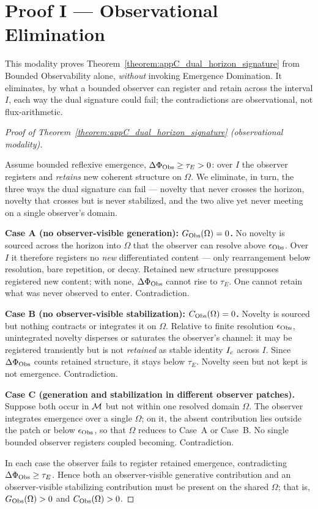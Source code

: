 \section{Proof I --- Observational Elimination} \label{sec:appC_proof_observational}
This modality proves Theorem~\ref{theorem:appC_dual_horizon_signature} from Bounded
Observability alone, \emph{without} invoking Emergence Domination. It eliminates, by
what a bounded observer can register and retain across the interval \(I\), each way
the dual signature could fail; the contradictions are observational, not
flux-arithmetic.
\begin{proof}[Proof of Theorem~\ref{theorem:appC_dual_horizon_signature} (observational modality)]
\label{proof:appC_dual_horizon_signature_observational}
\leavevmode

Assume bounded reflexive emergence, \(\Delta\Phi_{\mathrm{Obs}}\ge\tau_E>0\): over \(I\) the
observer registers and \emph{retains} new coherent structure on \(\Omega\). We
eliminate, in turn, the three ways the dual signature can fail --- novelty that never
crosses the horizon, novelty that crosses but is never stabilized, and the two alive
yet never meeting on a single observer's domain.

\textbf{Case A (no observer-visible generation): \(G_{\mathrm{Obs}}(\Omega)=0\).} No novelty
is sourced across the horizon into \(\Omega\) that the observer can resolve above
\(\epsilon_{\mathrm{Obs}}\). Over \(I\) it therefore registers no \emph{new} differentiated
content --- only rearrangement below resolution, bare repetition, or decay. Retained
new structure presupposes registered new content; with none, \(\Delta\Phi_{\mathrm{Obs}}\)
cannot rise to \(\tau_E\). One cannot retain what was never observed to enter.
Contradiction.

\textbf{Case B (no observer-visible stabilization): \(C_{\mathrm{Obs}}(\Omega)=0\).} Novelty
is sourced but nothing contracts or integrates it on \(\Omega\). Relative to finite
resolution \(\epsilon_{\mathrm{Obs}}\), unintegrated novelty disperses or saturates the
observer's channel: it may be registered transiently but is not \emph{retained} as
stable identity \(I_c\) across \(I\). Since \(\Delta\Phi_{\mathrm{Obs}}\) counts
retained structure, it stays below \(\tau_E\). Novelty seen but not kept is not
emergence. Contradiction.

\textbf{Case C (generation and stabilization in different observer patches).} Suppose
both occur in \(\mathcal{M}\) but not within one resolved domain \(\Omega\). The
observer integrates emergence over a single \(\Omega\); on it, the absent
contribution lies outside the patch or below \(\epsilon_{\mathrm{Obs}}\), so that \(\Omega\)
reduces to Case~A or Case~B. No single bounded observer registers coupled becoming.
Contradiction.

In each case the observer fails to register retained emergence, contradicting
\(\Delta\Phi_{\mathrm{Obs}}\ge\tau_E\). Hence both an observer-visible generative contribution
and an observer-visible stabilizing contribution must be present on the shared
\(\Omega\); that is, \(G_{\mathrm{Obs}}(\Omega)>0\) and \(C_{\mathrm{Obs}}(\Omega)>0\).
\end{proof}

